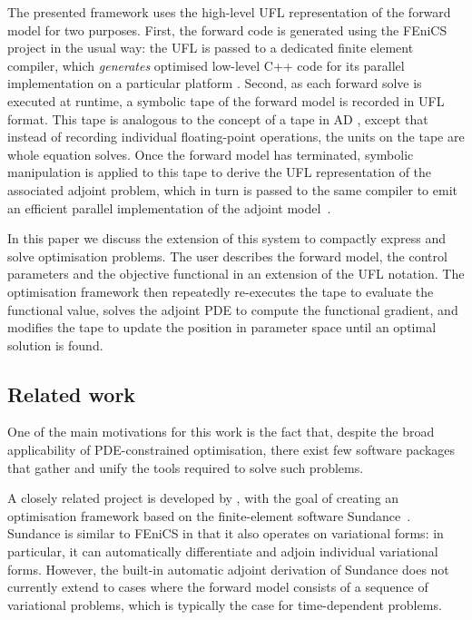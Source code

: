 \documentclass[prodmode,acmtoms]{acmsmall}
\newcommand{\fenics}{{\mbox{FEniCS}}\xspace}
\begin{document}
The presented framework uses the high-level UFL representation of the forward model for two purposes. 
First, the forward code is generated using the \fenics project in the usual way: the UFL is passed to a dedicated finite element compiler, which
\emph{generates} optimised low-level C++ code for its parallel implementation on a particular platform
\cite{kirby2006,olgaard2010,markall2012}. Second, as each forward solve is executed at runtime,
a symbolic tape of the forward model is recorded in UFL format. This tape is analogous to the concept of
a tape in AD \cite{corliss1993}, except that instead of recording individual floating-point operations, the units on the tape are
whole equation solves. Once the forward model has terminated, symbolic manipulation is
applied to this tape to derive the UFL representation of the associated adjoint problem, which in turn is
passed to the same compiler to emit an efficient parallel implementation of the adjoint model~\cite{farrell2012}. 

In this paper we discuss the extension of this system to compactly express and solve optimisation problems. 
The user describes the forward model, the control parameters and the objective functional in an extension of the UFL notation. 
The optimisation framework then repeatedly 
re-executes the tape to evaluate the functional value, solves the adjoint PDE to compute the functional gradient, 
and modifies the tape to update the position in parameter space until an optimal solution is found.

\subsection{Related work}\label{sec:related_frameworks}
One of the main motivations for this work is the fact that, despite the broad applicability of PDE-constrained optimisation, 
there exist few software packages that gather and unify the tools required to solve such problems.

A closely related project is developed by , with the goal of creating an optimisation framework based on the finite-element software Sundance~\cite{long2012}.
Sundance is similar to \fenics in that it also operates on variational forms: in particular, it can automatically differentiate and adjoin individual variational forms.  
However, the built-in automatic adjoint derivation of Sundance does not currently extend to cases where the forward model consists of a sequence of variational problems, 
which is typically the case for time-dependent problems.
\end{document}
